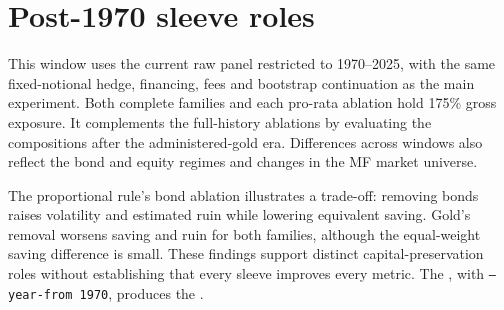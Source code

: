\section{Post-1970 sleeve roles}
\label{app:review-post1970}
This window uses the current raw panel restricted to 1970--2025, with the
same fixed-notional hedge, financing, fees and bootstrap continuation as the
main experiment. Both complete families and each pro-rata ablation hold
175\% gross exposure. It complements the full-history ablations by evaluating
the compositions after the administered-gold era. Differences across windows
also reflect the bond and equity regimes and changes in the MF market universe.

The proportional rule's bond ablation illustrates a trade-off: removing bonds
raises volatility and estimated ruin while lowering equivalent saving.
Gold's removal worsens saving and ruin for both families, although the
equal-weight saving difference is small. These findings support distinct
capital-preservation roles without establishing that every sleeve improves
every metric. The , with
\texttt{--year-from 1970}, produces the
.

